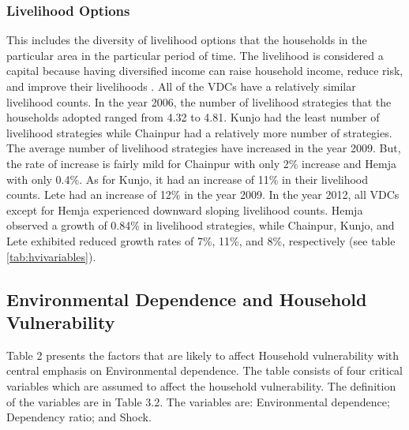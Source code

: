 \subsubsection{Livelihood Options}
This includes the diversity of livelihood options that the households in the particular area in the particular period of time. The livelihood is considered a capital because having diversified income can raise household income, reduce risk, and improve their livelihoods \citep{scoones2013livelihoods}. All of the VDCs have a relatively similar livelihood counts. In the year 2006, the number of livelihood strategies that the households adopted ranged from 4.32 to 4.81. Kunjo had the least number of livelihood strategies while Chainpur had a relatively more number of strategies. The average number of livelihood strategies have increased in the year 2009. But, the rate of increase is fairly mild for Chainpur with only 2\% increase and Hemja with only 0.4\%.  As for Kunjo, it had an increase of 11\% in their livelihood counts. Lete had an increase of 12\% in the year 2009. In the year 2012, all VDCs except for Hemja experienced downward sloping livelihood counts. Hemja observed a growth of 0.84\% in livelihood strategies, while Chainpur, Kunjo, and Lete exhibited reduced growth rates of 7\%, 11\%, and 8\%, respectively (see table \ref{tab:hvivariables}).

\subsection{Environmental Dependence and Household Vulnerability}
Table 2 presents the factors that are likely to affect Household vulnerability with central emphasis on Environmental dependence. The table consists of four critical variables which are assumed to affect the household vulnerability. The definition of the variables are in Table 3.2. The variables are: Environmental dependence; Dependency ratio; and Shock.


